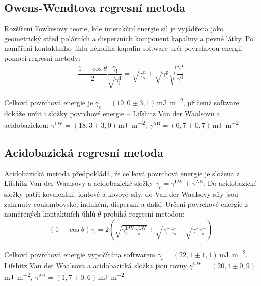 \documentclass{protokol}
\begin{document}
\subsection{Owens-Wendtova regresní metoda}
Rozšíření Fowkesovy teorie, kde interakční energie sil je vyjádřena jako 
geometrický střed polárních a disperzních komponent kapaliny a pevné látky. Po 
naměření kontaktního úhlu několika kapalin software určí povrchovou energii 
pomocí regresní metody:
\begin{equation}
	\frac{1+\cos\theta}{2}\frac{\gamma_{\text{l}}}{\sqrt{\gamma_{\text{l}}^\text{d}}}
	 = \sqrt{\gamma_{\text{s}}^\text{d}} + \sqrt{\gamma_{\text{s}}^\text{p}} 
	 \sqrt{\frac{\gamma_{\text{l}}^\text{p}}{\gamma_{\text{l}}^\text{d}}}
\end{equation}
\par Celková povrchová energie je $\gamma_{\text{c}} = (19,0 \pm 
3,1)$\,\si{\milli\joule\per\meter\squared}, přičemž software dokáže určit i 
složky povrchové energie -- Lifshitz Van der Waalsovu a acidobazickou: 
$\gamma^\text{LW} = (18,3\pm3,0)$\,\si{\milli\joule\per\meter\squared}; 
$\gamma^\text{AB} = (0,7\pm0,7)$\,\si{\milli\joule\per\meter\squared}


\subsection{Acidobazická regresní metoda}
\par Acidobazická metoda předpokládá, že celková povrchová energie je složena z 
Lifshitz Van der Waalsovy a acidobazické složky $\gamma_{\text{c}} = 
\gamma^\text{LW} + \gamma^\text{AB}$. Do acidobazické složky patři kovalentní, 
iontové a kovové síly, do Van der Waalsovy síly jsou zahrnuty coulombovské, 
indukční, disperzní a další. Určení povrchové energie z naměřených kontaktních 
úhlů $\theta$ probíhá regresní metodou:
\begin{equation}
		\left(1+\cos\theta\right)\gamma_{\text{l}} = 
		2\left(\sqrt{\gamma_\text{l}^{\text{LW}}\gamma_\text{s}^{\text{LW}}} + 
		\sqrt{\gamma_\text{l}^{\text{+}}\gamma_\text{s}^{\text{-}}} + 
		\sqrt{\gamma_\text{l}^{\text{-}}\gamma_\text{s}^{\text{+}}}\right)
\end{equation}
\par Celková povrchová energie vypočítána softwarem $\gamma_{\text{c}} = (22,1 
\pm 
1,1)$\,\si{\milli\joule\per\meter\squared}. Lifshitz Van der Waalsova a 
acidobazická složka jsou rovny $\gamma^\text{LW} = 
(20,4\pm0,9)$\,\si{\milli\joule\per\meter\squared}, 
$\gamma^\text{AB} = (1,7\pm0,6)$\,\si{\milli\joule\per\meter\squared}
\end{document}
